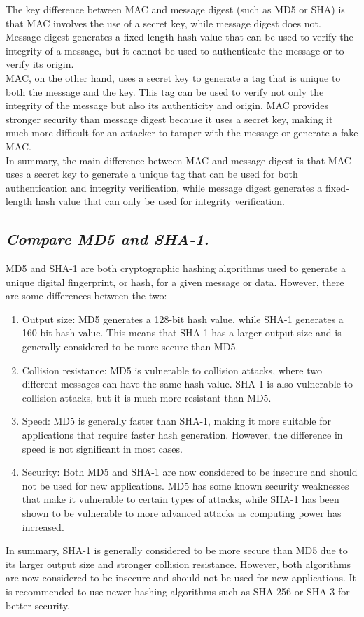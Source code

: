 \documentclass{article}
\begin{document}
The key difference between MAC and message digest (such as MD5 or SHA) is that MAC involves the use of a secret key, while message digest does not. Message digest generates a fixed-length hash value that can be used to verify the integrity of a message, but it cannot be used to authenticate the message or to verify its origin.\\

MAC, on the other hand, uses a secret key to generate a tag that is unique to both the message and the key. This tag can be used to verify not only the integrity of the message but also its authenticity and origin. MAC provides stronger security than message digest because it uses a secret key, making it much more difficult for an attacker to tamper with the message or generate a fake MAC.\\

In summary, the main difference between MAC and message digest is that MAC uses a secret key to generate a unique tag that can be used for both authentication and integrity verification, while message digest generates a fixed-length hash value that can only be used for integrity verification.
\subsection{\textit{Compare MD5 and SHA-1.}}
MD5 and SHA-1 are both cryptographic hashing algorithms used to generate a unique digital fingerprint, or hash, for a given message or data. However, there are some differences between the two:
\begin{enumerate}
    \item Output size: MD5 generates a 128-bit hash value, while SHA-1 generates a 160-bit hash value. This means that SHA-1 has a larger output size and is generally considered to be more secure than MD5.
    \item Collision resistance: MD5 is vulnerable to collision attacks, where two different messages can have the same hash value. SHA-1 is also vulnerable to collision attacks, but it is much more resistant than MD5.
    \item Speed: MD5 is generally faster than SHA-1, making it more suitable for applications that require faster hash generation. However, the difference in speed is not significant in most cases.
    \item Security: Both MD5 and SHA-1 are now considered to be insecure and should not be used for new applications. MD5 has some known security weaknesses that make it vulnerable to certain types of attacks, while SHA-1 has been shown to be vulnerable to more advanced attacks as computing power has increased.
\end{enumerate}
In summary, SHA-1 is generally considered to be more secure than MD5 due to its larger output size and stronger collision resistance. However, both algorithms are now considered to be insecure and should not be used for new applications. It is recommended to use newer hashing algorithms such as SHA-256 or SHA-3 for better security.
\end{document}
